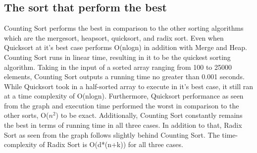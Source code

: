 \documentclass[12pt]{article}
\begin{document}
\indent \\\\\\\\\\\\\\\\\\\\\\\\\\\\\\\\\\\\\\\\\\\\\\\\\\\\\\\\\\\\\\\\\\\\\\\\\\\\\\\\\\\\
\subsection{The sort that perform the best}
Counting Sort performs the best in comparison to the other sorting algorithms which are the mergesort, heapsort, quicksort, and radix sort. Even when Quicksort at it’s best case performs O(nlogn) in addition with Merge and Heap. Counting Sort runs in linear time, resulting in it to be the quickest sorting algorithm. Taking in the input of a sorted array ranging from 100 to 25000 elements, Counting Sort outputs a running time no greater than 0.001 seconds. While Quicksort took in a half-sorted array to execute in it’s best case, it still ran at a time complexity of O(nlogn). Furthermore, Quicksort performance as seen from the graph and execution time performed the worst in comparison to the other sorts, O($n^2$) to be exact. Additionally, Counting Sort constantly remains the best in terms of running time in all three cases. In addition to that, Radix Sort as seen from the graph follows slightly behind Counting Sort. The time-complexity of Radix Sort is O(d*(n+k)) for all three cases. 
\indent \\\\
\end{document}
